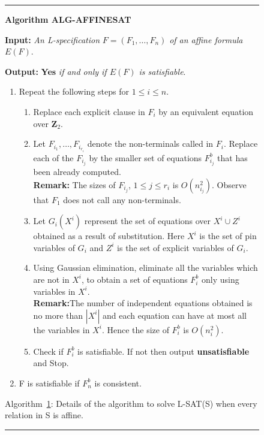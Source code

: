 \smallspacing

{\small
\begin{figure}[tbp]
\rule{10cm}{0.01in}

\noindent
{\bf Algorithm ALG-AFFINESAT} 

\noindent
{\bf Input:} {\it An L-specification} $F = (F_1, \ldots , F_n)$
{\it of an affine formula } $E(F)$.  

\noindent
{\bf Output:} {\bf Yes} {\it if and only if $E(F)$ is satisfiable}. 

\begin{enumerate}

\item
Repeat the following steps for $1 \leq i \leq n$.

\begin{enumerate}

\item
Replace each explicit clause in $F_i$ by an equivalent equation over 
{\bf Z}$_2$.


\item
Let $F_{i_1}, \ldots, F_{i_{r_i}}$ denote the non-terminals called in $F_i$.
Replace each of the $F_{i_j}$ by the smaller set of equations $F^b_{i_j}$
that has been already computed.\\
{\bf Remark:} The sizes of $F_{i_j}$, $ 1 \leq j \leq r_i$ is $O(n_{i_j}^2)$.
Observe that $F_1$ does not call any non-terminals.

\item 
Let $G_i(X^i)$ represent the set of equations  over $X^i \cup Z^i$
obtained as a result of substitution. Here $X^i$ is the set of pin variables of $G_i$ 
and $Z^i$ is the set of explicit variables of $G_i$.


\item
Using Gaussian elimination, eliminate all the variables which are not
in $X^i$, to obtain a set of equations $F^b_i$ only using variables in $X^i$.\\
{\bf Remark:}The number of independent equations obtained 
is no more than $|X^i|$ and
each equation can have at most all the variables in $X^i$.
Hence the size of $F^b_i$ is $O(n_i^2)$.

\item
Check if $F^b_i$ is satisfiable. If not then output {\bf unsatisfiable} and 
Stop.

\end{enumerate}


\item
F is satisfiable if $F_n^b$ is consistent.

\end{enumerate}
\label{laffinesat:alg}
\begin{center}
Algorithm~\ref{laffinesat:alg}: Details of the algorithm to solve {\sf L-SAT(S)
when every relation in {\sf S} is affine.}
\end{center}
\vspace*{-.2in}
\rule{10cm}{0.01in}
\end{figure}
}

